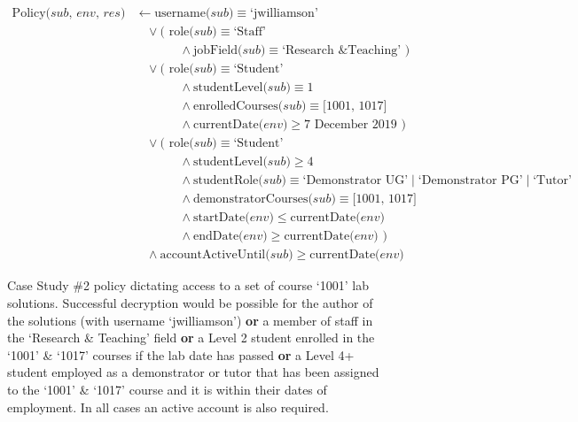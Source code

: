 \begin{figure}[ht]
  \centering
\begin{align*}
  \text{Policy($sub$, $env$, $res$)}
  &
    \leftarrow
    \text{username($sub$)} \equiv \text{`jwilliamson'}
  \\
  &
    \phantom{::}\vee
    \text{( role($sub$)} \equiv \text{`Staff'}
  \\
  &
    \phantom{::::::::}\wedge
    \text{jobField($sub$)} \equiv \text{`Research \& Teaching' )}
  \\
  &
    \phantom{::}\vee
    \text{( role($sub$)} \equiv \text{`Student'}
  \\
  &
    \phantom{::::::::}\wedge
    \text{studentLevel($sub$)} \equiv \text{1}
  \\
  &
    \phantom{::::::::}\wedge
    \text{enrolledCourses($sub$)} \equiv \text{[1001, 1017]}
  \\
  &
    \phantom{::::::::}\wedge
    \text{currentDate($env$)} \geq \text{7 December 2019 )}
  \\
  &
    \phantom{::}\vee
    \text{( role($sub$)} \equiv \text{`Student'}
  \\
  &
    \phantom{::::::::}\wedge
    \text{studentLevel($sub$)} \geq \text{4}
  \\
  &
    \phantom{::::::::}\wedge
    \text{studentRole($sub$)} \equiv \text{`Demonstrator UG'} \mid \text{`Demonstrator PG'} \mid \text{`Tutor'}
  \\
  &
    \phantom{::::::::}\wedge
    \text{demonstratorCourses($sub$)} \equiv \text{[1001, 1017]}
  \\
  &
    \phantom{::::::::}\wedge
    \text{startDate($env$)} \leq \text{currentDate($env$)}
  \\
  &
    \phantom{::::::::}\wedge
    \text{endDate($env$)} \geq \text{currentDate($env$) )}
  \\
  &
    \phantom{::}\wedge
    \text{accountActiveUntil($sub$)} \geq \text{currentDate($env$)}
\end{align*}
  \caption{
    \label{fig:case_study_policy_2}
    Case Study \#2 policy dictating access to a set of course `1001' lab solutions.
    Successful decryption would be possible for the author of the solutions (with username `jwilliamson') \textbf{or} a member of staff in the `Research \& Teaching' field \textbf{or} a Level 2 student enrolled in the `1001' \& `1017' courses if the lab date has passed \textbf{or} a Level 4+ student employed as a demonstrator or tutor that has been assigned to the `1001' \& `1017' course and it is within their dates of employment. In all cases an active account is also required.
  }
\end{figure}
